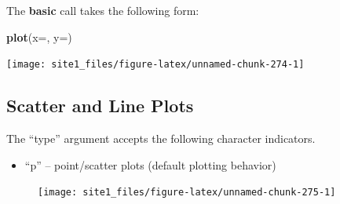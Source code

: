 \documentclass[]{book}
\newenvironment{Shaded}{\begin{snugshade}}{\end{snugshade}}
\newcommand{\DataTypeTok}[1]{\textcolor[rgb]{0.13,0.29,0.53}{#1}}
\newcommand{\KeywordTok}[1]{\textcolor[rgb]{0.13,0.29,0.53}{\textbf{#1}}}
\newcommand{\NormalTok}[1]{#1}
\newcommand{\OperatorTok}[1]{\textcolor[rgb]{0.81,0.36,0.00}{\textbf{#1}}}
\newcommand{\StringTok}[1]{\textcolor[rgb]{0.31,0.60,0.02}{#1}}
\providecommand{\tightlist}{%
  \setlength{\itemsep}{0pt}\setlength{\parskip}{0pt}}
\begin{document}
The \textbf{basic} call takes the following form:

\begin{Shaded}
\begin{Highlighting}[]
\KeywordTok{plot}\NormalTok{(}\DataTypeTok{x=}\NormalTok{, }\DataTypeTok{y=}\NormalTok{)}
\end{Highlighting}
\end{Shaded}

\begin{Shaded}
\end{Shaded}

\begin{center}\texttt{[image: site1\_files/figure-latex/unnamed-chunk-274-1]} \end{center}

\hypertarget{scatter-and-line-plots}{%
\subsection{Scatter and Line Plots}\label{scatter-and-line-plots}}

The ``type'' argument accepts the following character indicators.

\begin{itemize}
\tightlist
\item
  ``p'' -- point/scatter plots (default plotting behavior)
\end{itemize}

\begin{Shaded}
\end{Shaded}

\begin{figure}

{\centering \texttt{[image: site1\_files/figure-latex/unnamed-chunk-275-1]} 

}

\caption{ }\label{fig:unnamed-chunk-275}
\end{figure}
\end{document}

